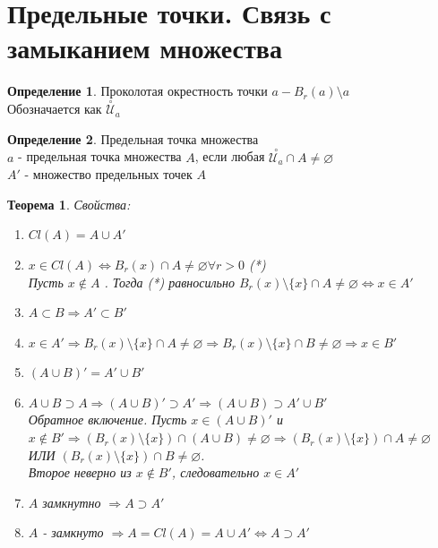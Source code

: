 \documentclass[12pt,letterpaper]{report}
\makeatletter
\newtheorem*{theorem-non}{Теорема}
\theoremstyle{definition}
\newtheorem*{conj}{Определение}
\renewenvironment{proof}[1][\proofname]{%
   \par\pushQED{\qed}\normalfont%
   \topsep6\p@\@plus6\p@\relax
   \trivlist\item[\hskip\labelsep\bfseries#1\@addpunct{.}]%
   \ignorespaces
}{%
   \popQED\endtrivlist\@endpefalse
}
\makeatother
\begin{document}
\section{Предельные точки. Связь с замыканием множества}
\begin{conj}

    Проколотая окрестность точки $a - B_r(a) \setminus {a}$ \\
    Обозначается как $\overset{\circ}{\mathcal{U}}_a$
\end{conj}
    \begin{conj}
        Предельная точка множества \\
        $a$ - предельная точка множества $A$, если любая $\overset{\circ}{\mathcal{U}_a}\cap A \neq \varnothing$\\
        $A'$ - множество предельных точек $A$
    \end{conj} 
    \begin{theorem-non}
        Свойства:
        \begin{enumerate}
            \item $Cl(A) = A\cup A'$
            \begin{proof}
                $x \in Cl(A) \Longleftrightarrow B_r(x)\cap A \neq \varnothing \forall r>0$ (*) \\
                Пусть $x \notin A$ . Тогда (*) равносильно $B_r(x)\setminus \{x\} \cap A \neq \varnothing \Longleftrightarrow x\in A'$
            \end{proof}
            \item $A \subset B \Longrightarrow A' \subset B'$
            \begin{proof}
                $x \in A' \Longrightarrow B_r(x)\setminus \{x\} \cap A  \neq \varnothing \Longrightarrow B_r(x)\setminus \{x\} \cap B \neq \varnothing \Longrightarrow x \in B'$
            \end{proof}
            \item $(A\cup B)' = A' \cup B'$
            \begin{proof}
                $A \cup B \supset A \Longrightarrow (A\cup B)' \supset A' \Longrightarrow (A\cup B) \supset A'\cup B'$ \\
                Обратное включение. Пусть $x\in (A\cup B)'$ и $x \notin B' \Longrightarrow (B_r(x)\setminus \{x\})\cap (A\cup B) \neq \varnothing \Longrightarrow (B_r(x)\setminus \{x\})\cap A \neq \varnothing$ ИЛИ $(B_r(x)\setminus \{x\})\cap B \neq \varnothing$. \\
                Второе неверно из $x\notin B'$, следовательно $x \in A'$
            \end{proof}
            \item $A$ замкнутно $\Longrightarrow A\supset A'$
            \begin{proof}
                $A$ - замкнуто $\Longrightarrow A = Cl(A) = A \cup A' \Longleftrightarrow A \supset A'$
            \end{proof}
        \end{enumerate}
    \end{theorem-non}
    
\end{document}
